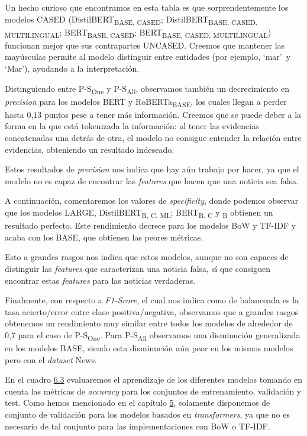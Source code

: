 Un hecho curioso que encontramos en esta tabla es que sorprendentemente los modelos CASED ({DistilBERT}\textsubscript{BASE, CASED}; {DistilBERT}\textsubscript{BASE, CASED, MULTILINGUAL}; {BERT}\textsubscript{BASE, CASED}; {BERT}\textsubscript{BASE, CASED, MULTILINGUAL}) funcionan mejor que sus contrapartes UNCASED. Creemos que mantener las mayúsculas permite al modelo distinguir entre entidades (por ejemplo, `mar'\ y `Mar'), ayudando a la interpretación. 


Distinguiendo entre P-S\textsubscript{One} y P-S\textsubscript{All}, observamos también un decrecimiento en \textit{precision} para los modelos BERT y {RoBERTa}\textsubscript{BASE}, los cuales llegan a perder hasta 0,13 puntos pese a tener más información. Creemos que se puede deber a la forma en la que está tokenizada la información: al tener las evidencias concatenadas una detrás de otra, el modelo no consigue entender la relación entre evidencias, obteniendo un resultado indeseado.

Estos resultados de \textit{precision} nos indica que hay aún trabajo por hacer, ya que el modelo no es capaz de encontrar las \textit{features} que hacen que una noticia sea falsa.

A continuación, comentaremos los valores de \textit{specificity}, donde podemos observar que los modelos LARGE, {DistilBERT}\textsubscript{B, C, ML}; {BERT}\textsubscript{B, C} y \textsubscript{B} obtienen un resultado perfecto. Este rendimiento decrece para los modelos BoW y TF-IDF y acaba con los BASE, que obtienen las peores métricas.

Esto a grandes rasgos nos indica que estos modelos, aunque no son capaces de distinguir las \textit{features} que caracterizan una noticia falsa, sí que consiguen encontrar estas \textit{features} para las noticias verdaderas.

Finalmente, con respecto a \textit{F1-Score}, el cual nos indica como de balanceada es la tasa acierto/error entre clase positiva/negativa, observamos que a grandes rasgos obtenemos un rendimiento muy similar entre todos los modelos de alrededor de 0,7 para el caso de P-S\textsubscript{One}. Para P-S\textsubscript{All} observamos una disminución generalizada en los modelos BASE, siendo esta disminución aún peor en los mismos modelos pero con el \textit{dataset} News.

En el cuadro \hyperref[tab:train-eval-test]{6.3} evaluaremos el aprendizaje de los diferentes modelos tomando en cuenta las métricas de \textit{accuracy} para los conjuntos de entrenamiento, validación y test. Como hemos mencionado en el capítulo \hyperref[sec:metodologia]{5}, solamente disponemos de conjunto de validación para los modelos basados en \textit{transformers}, ya que no es necesario de tal conjunto para las implementaciones con BoW o TF-IDF.


